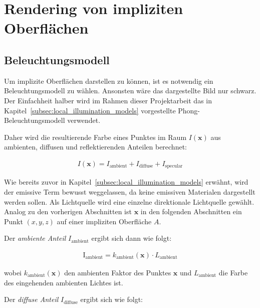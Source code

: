 
\section{Rendering von impliziten Oberflächen}
\label{sec:rendering_implicit_surfaces}

\subsection{Beleuchtungsmodell}
\label{sec:rendering_implicit_surfaces_lighting}

Um implizite Oberflächen darstellen zu können, ist es notwendig ein
Beleuchtungsmodell zu wählen. Ansonsten wäre das dargestellte Bild nur schwarz.
Der Einfachheit halber wird im Rahmen dieser Projektarbeit das in
Kapitel~\ref{subsec:local_illumination_models} vorgestellte
Phong-Beleuchtungsmodell verwendet.

Daher wird die resultierende Farbe eines Punktes im Raum $I(\bm{x})$ aus
ambienten, diffusen und reflektierenden Anteilen berechnet:

\begin{gather}
    I(\bm{x}) = I_{\text{ambient}} + I_{\text{diffuse}} + I_{\text{specular}}
\end{gather}

Wie bereits zuvor in Kapitel~\ref{subsec:local_illumination_models} erwähnt,
wird der emissive Term bewusst weggelassen, da keine emissiven Materialen
dargestellt werden sollen. Als Lichtquelle wird eine einzelne direktionale
Lichtquelle gewählt. Analog zu den vorherigen Abschnitten ist $\bm{x}$
in den folgenden Abschnitten ein Punkt $(x, y, z)$ auf einer impliziten
Oberfläche $A$.

Der \textit{ambiente Anteil} $I_{\text{ambient}}$ ergibt sich dann wie
folgt:

\begin{gather}
    \text{I}_{\text{ambient}} = k_{\text{ambient}}(\bm{x}) \cdot L_{\text{ambient}}
\end{gather}

wobei $k_{\text{ambient}}(\bm{x})$ den ambienten Faktor des
Punktes $\bm{x}$ und $L_{\text{ambient}}$ die Farbe des eingehenden ambienten
Lichtes ist.

Der \textit{diffuse Anteil} $I_{\text{diffuse}}$ ergibt sich wie folgt:

